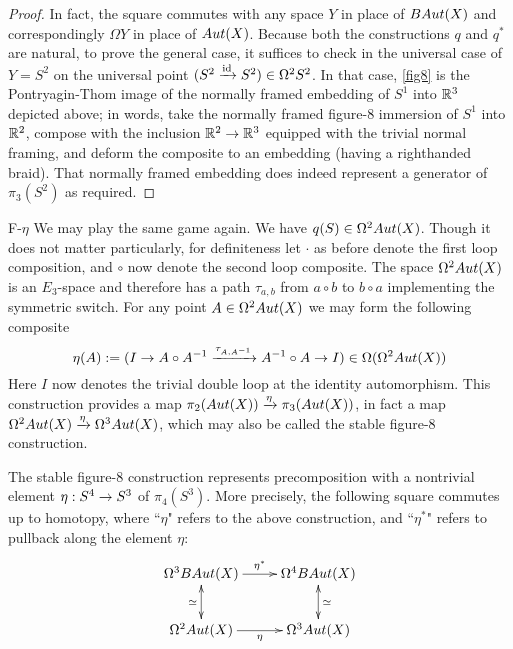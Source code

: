 \documentclass{amsart}
\begin{document}
\begin{proof}
In fact, the square commutes with any space $Y$ in place of $BAut(X)$ and correspondingly $\Omega Y$ in place of $Aut(X)$.  Because both the constructions $q$ and $q^\ast$ are natural, to prove the general case, it suffices to check in the universal case of $Y = S^2$ on the universal point $(S^2 \xrightarrow{\mathrm{id}} S^2) \in \Omega^2 S^2$.  In that case, \cref{fig8} is the Pontryagin-Thom image of the normally framed embedding of $S^1$ into $\mathbb R^3$ depicted above; in words, take the normally framed figure-8 immersion of $S^1$ into $\mathbb R^2$, compose with the inclusion $\mathbb R^2 \rightarrow \mathbb R^3$ equipped with the trivial normal framing, and deform the composite to an embedding (having a righthanded braid).  That normally framed embedding does indeed represent a generator of $\pi_3(S^2)$ as required.
\end{proof}

\begin{tconstr}{F-$\eta$}
\label{figeta}
We may play the same game again.  We have $q(S) \in \Omega^2 Aut(X)$.  Though it does not matter particularly, for definiteness let $\cdot$ as before denote the first loop composition, and $\circ$ now denote the second loop composite.  The space $\Omega^2 Aut(X)$ is an $E_3$-space and therefore has a path $\tau_{a,b}$ from $a \circ b$ to $b \circ a$ implementing the symmetric switch.  For any point $A \in \Omega^2 Aut(X)$ we may form the following composite
\[
\eta(A) := (I \rightarrow A \circ A^{-1} \xrightarrow{\tau_{A,A^{-1}}} A^{-1} \circ A \rightarrow I) \in \Omega(\Omega^2 Aut(X))
\]
Here $I$ now denotes the trivial double loop at the identity automorphism.  This construction provides a map $\pi_2(Aut(X)) \xrightarrow{\eta} \pi_3(Aut(X))$, in fact a map $\Omega^2 Aut(X) \xrightarrow{\eta} \Omega^3 Aut(X)$, which may also be called the stable figure-8 construction.
\end{tconstr}

\begin{lemma} 
\label{lemma-eta}
The stable figure-8 construction represents precomposition with a nontrivial element $\eta: S^4 \rightarrow S^3$ of $\pi_4(S^3)$.  More precisely, the following square commutes up to homotopy, where ``$\eta$" refers to the above construction, and ``$\eta^\ast$" refers to pullback along the element $\eta$:
\[
\xymatrix{
\Omega^3 B\Aut(X) \ar[r]^{\eta^\ast} \ar@{<->}[d]_{\simeq} & \Omega^4 B\Aut(X)  \ar@{<->}[d]^{\simeq} \\
\Omega^2 \Aut(X) \ar[r]_{\eta} & \Omega^3 \Aut(X)
}
\]
\end{lemma}
\end{document}
